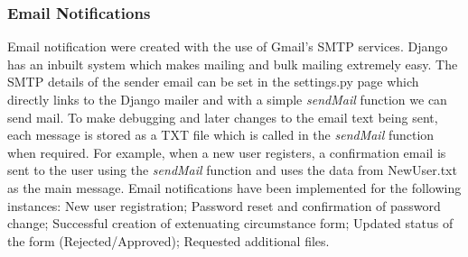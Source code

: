 \documentclass[../main.tex]{subfiles}
\begin{document}
\subsubsection{Email Notifications} 
Email notification were created with the use of Gmail's SMTP services. Django has an inbuilt system which makes mailing and bulk mailing extremely easy. The SMTP details of the sender email can be set in the settings.py page which directly links to the Django mailer and with a simple \textit{sendMail} function we can send mail. To make debugging and later changes to the email text being sent, each message is stored as a TXT file which is called in the \textit{sendMail} function when required. For example, when a new user registers, a confirmation email is sent to the user using the \textit{sendMail} function and uses the data from NewUser.txt as the main message. Email notifications have been implemented for the following instances: New user registration; Password reset and confirmation of password change; Successful creation of extenuating circumstance form; Updated status of the form (Rejected/Approved); Requested additional files.
\end{document}
